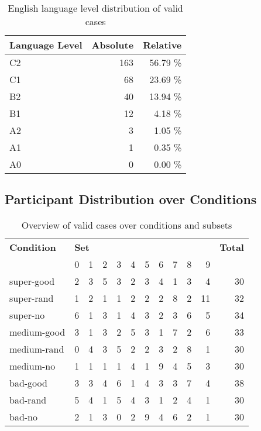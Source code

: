 \begin{table}[H]
	\centering
	\begin{tabular}{l|rr}
		\textbf{Language Level} & \textbf{Absolute} & \textbf{Relative} \\ \midrule
		C2 			& 163 & 56.79 \%\\
		C1		 	& 68 & 23.69 \%\\
		B2	 		& 40 & 13.94 \%\\ 
		B1 			& 12 & 4.18 \%\\ 
		A2 			& 3 & 1.05 \%\\ 
		A1	 		& 1 & 0.35 \%\\ 
		A0 			& 0 & 0.00 \%\\ \bottomrule
	\end{tabular}
	\caption{English language level distribution of valid cases}
\end{table}




\subsection{Participant Distribution over Conditions}
\begin{table}[H]
	\centering
	\begin{tabular}{l|rrrrrrrrrr|r}
		\textbf{Condition} & \multicolumn{10}{l|}{\textbf{Set}} & \textbf{Total} \\
		  & 0 & 1 & 2 & 3 & 4 & 5 & 6 & 7 & 8 & 9 & \\ \midrule
		super-good & 	2 &  3 &  5 &  3 &  2 &  3 &  4 &  1 &  3 &  4 &  	 30 \\
		super-rand & 	1 &  2 &  1 &  1 &  2 &  2 &  2 &  8 &  2 &  11 &  	 32 \\
		super-no & 	6 &  1 &  3 &  1 &  4 &  3 &  2 &  3 &  6 &  5 &  	 34 \\
		medium-good & 	3 &  1 &  3 &  2 &  5 &  3 &  1 &  7 &  2 &  6 &  	 33 \\
		medium-rand & 	0 &  4 &  3 &  5 &  2 &  2 &  3 &  2 &  8 &  1 &  	 30 \\
		medium-no & 	1 &  1 &  1 &  1 &  4 &  1 &  9 &  4 &  5 &  3 &  	 30 \\
		bad-good & 	3 &  3 &  4 &  6 &  1 &  4 &  3 &  3 &  7 &  4 &  	 38 \\
		bad-rand & 	5 &  4 &  1 &  5 &  4 &  3 &  1 &  2 &  4 &  1 &  	 30 \\
		bad-no & 	2 &  1 &  3 &  0 &  2 &  9 &  4 &  6 &  2 &  1 &  	 30 \\ \bottomrule
	\end{tabular}
	\caption{Overview of valid cases over conditions and subsets}
\end{table}





